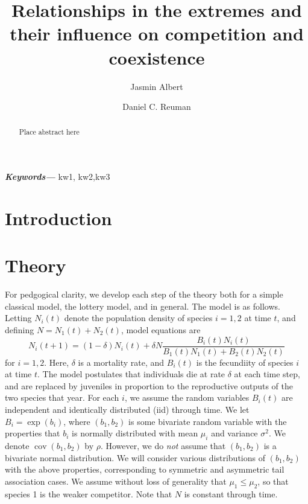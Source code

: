 \documentclass[letterpaper,11pt]{article}\usepackage[]{graphicx}\usepackage[]{color}
\title{Relationships in the extremes and their influence on competition and coexistence}
\date{}
\author[a]{Jasmin Albert}
\author[a,b]{Daniel C. Reuman}
\affil[a]{Department of Ecology and Evolutionary Biology and Kansas Biological Survey, University of Kansas}
\affil[b]{Laboratory of Populations, Rockefeller University}
\providecommand{\keywords}[1]
{
  \small	
  \textbf{\textit{Keywords---}} #1
}
\DeclareMathOperator{\CovX}{cov}
\begin{document}



\maketitle

\begin{abstract}
Place abstract here
\end{abstract}

\keywords{kw1, kw2,kw3}

\section{Introduction}\label{section:introduction}


\section{Theory}\label{section:theory}

For pedgogical clarity, we develop each step of the theory both for a simple classical model, 
the lottery model, and in general. The model is as follows. 
Letting $N_i(t)$ denote the population density of species $i=1,2$ at time $t$, and defining $N = N_1(t)+N_2(t)$,
model equations are
\begin{equation}
N_i(t+1)=(1-\delta)N_i(t)+\delta N \frac{B_i(t)N_i(t)}{B_1(t)N_1(t)+B_2(t)N_2(t)}  \label{model_eq}
\end{equation}
for $i=1,2$. Here, $\delta$ is a mortality rate, and $B_i(t)$ is the fecundiity of species $i$ at time $t$. 
The model postulates that individuals die at rate $\delta$ at each time step, and are replaced by juveniles 
in proportion to the reproductive outputs of the two species that year.
For each $i$, we assume the random variables $B_i(t)$ are independent and identically distributed (iid) through
time. We let $B_i = \exp(b_i)$, where $\left(b_1, b_2\right)$ is some bivariate random variable with the properties 
that $b_i$ is normally distributed with mean $\mu_i$ and variance $\sigma^2$. 
We denote $\CovX(b_1, b_2)$ by $\rho$. However, we do \emph{not} assume that $\left(b_1, b_2\right)$ is a 
bivariate normal distribution. We will consider various distributions of $\left(b_1, b_2\right)$ with the above 
properties, corresponding to symmetric and asymmetric tail association cases.
We assume without loss of generality that $\mu_1 \leq \mu_2$, so that species 1 is the weaker competitor.
Note that $N$ is constant through time.
\end{document}
